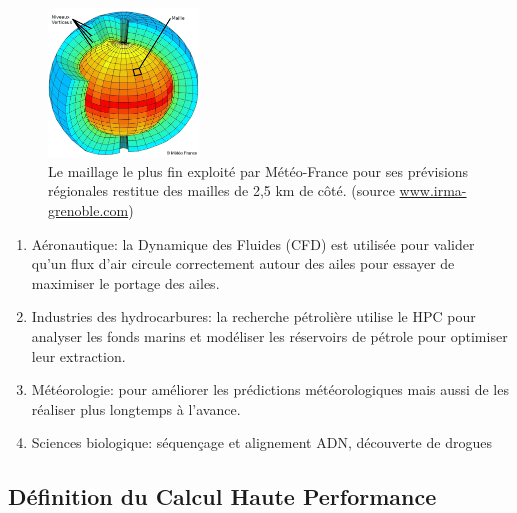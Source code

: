 \begin{figure}
    \center
    \includegraphics[width=4cm]{images/Chapitre1/maillage.png}
    \caption{\label{pic_maillage} Le maillage le plus fin exploité par Météo-France pour ses prévisions régionales restitue des mailles de 2,5 km de côté. (source \url{www.irma-grenoble.com})}
\end{figure}




\begin{enumerate}
\item Aéronautique: la Dynamique des Fluides (CFD) est utilisée pour valider qu'un flux d'air circule correctement autour des ailes pour essayer de maximiser le portage des ailes. 
\item Industries des hydrocarbures: la recherche pétrolière utilise le HPC pour analyser les fonds marins et modéliser les réservoirs de pétrole pour optimiser leur extraction.
\item Météorologie: pour améliorer les prédictions météorologiques mais aussi de les réaliser plus longtemps à l'avance. 
\item Sciences biologique: séquençage et alignement ADN, découverte de drogues 
\end{enumerate}




\subsection{Définition du Calcul Haute Performance}
 
